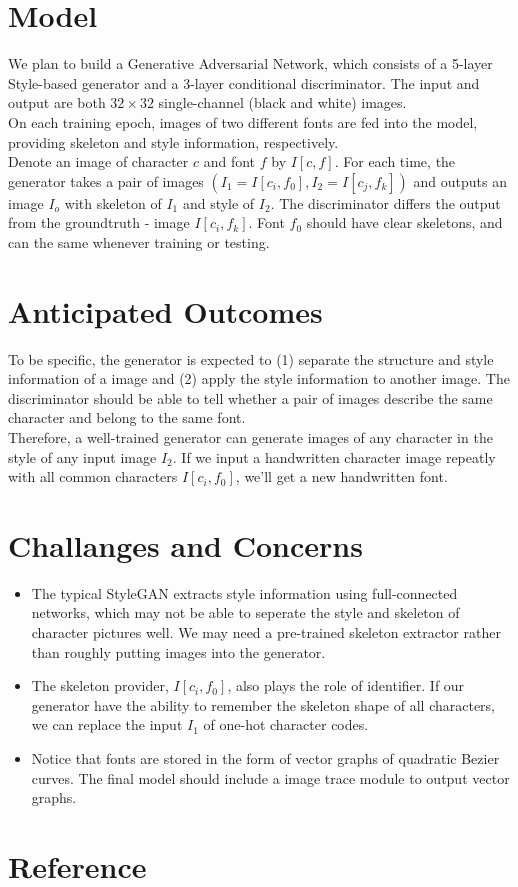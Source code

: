 \documentclass[letterpaper]{article}
\begin{document}
\section{Model}
We plan to build a Generative Adversarial Network, which consists of a 5-layer Style-based generator and a 3-layer conditional discriminator. The input and output are both $32 \times 32$ single-channel (black and white) images.
\\
On each training epoch, images of two different fonts are fed into the model, providing skeleton and style information, respectively.
\\
Denote an image of character $c$ and font $f$ by $I[c,f]$. For each time, the generator takes a pair of images $(I_1=I[c_i,f_0], I_2=I[c_j,f_k])$ and outputs an image $I_o$ with skeleton of $I_1$ and style of $I_2$. The discriminator differs the output from the groundtruth - image $I[c_i,f_k]$. Font $f_0$ should have clear skeletons, and can the same whenever training or testing.

\section{Anticipated Outcomes}
To be specific, the generator is expected to (1) separate the structure and style information of a image and (2) apply the style information to another image. The discriminator should be able to tell whether a pair of images describe the same character and belong to the same font.
\\
Therefore, a well-trained generator can generate images of any character in the style of any input image $I_2$. If we input a handwritten character image repeatly with all common characters $I[c_i,f_0]$, we'll get a new handwritten font.

\section{Challanges and Concerns}
\begin{itemize}
    \item The typical StyleGAN extracts style information using full-connected networks, which may not be able to seperate the style and skeleton of character pictures well. We may need a pre-trained skeleton extractor rather than roughly putting images into the generator.
    \item The skeleton provider, $I[c_i,f_0]$, also plays the role of identifier. If our generator have the ability to remember the skeleton shape of all characters, we can replace the input $I_1$ of one-hot character codes.
    \item Notice that fonts are stored in the form of vector graphs of quadratic Bezier curves. The final model should include a image trace module to output vector graphs.
\end{itemize}

\section{Reference}



\end{document}
